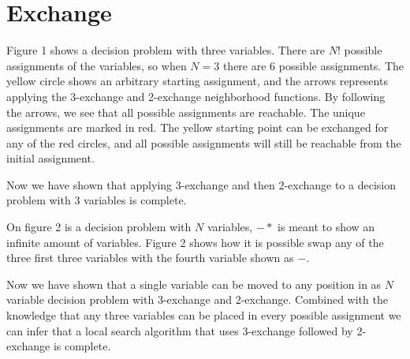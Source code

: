 \section{Exchange}
Figure 1 shows a decision problem with three variables. There are $N!$ possible assignments of the variables, so when $N = 3$ there are $6$ possible assignments. The yellow circle shows an arbitrary starting assignment, and the arrows represents applying the 3-exchange and 2-exchange neighborhood functions. By following the arrows, we see that all possible assignments are reachable. The unique assignments are marked in red. The yellow starting point can be exchanged for any of the red circles, and all possible assignments will still be reachable from the initial assignment.

Now we have shown that applying 3-exchange and then 2-exchange to a decision problem with $3$ variables is complete.

On figure 2 is a decision problem with $N$ variables, $-*$ is meant to show an infinite amount of variables. Figure 2 shows how it is possible swap any of the three first three variables with the fourth variable shown as $-$.

Now we have shown that a single variable can be moved to any position in as $N$ variable decision problem with 3-exchange and 2-exchange. Combined with the knowledge that any three variables can be placed in every possible assignment we can infer that a local search algorithm that uses 3-exchange followed by 2-exchange is complete.